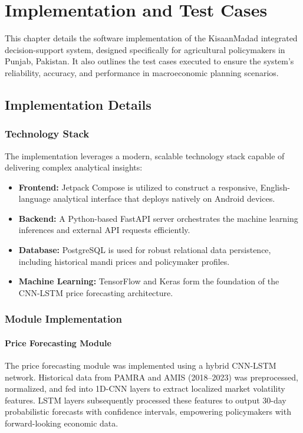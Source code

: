 \chapter{Implementation and Test Cases}

This chapter details the software implementation of the KisaanMadad integrated decision-support system, designed specifically for agricultural policymakers in Punjab, Pakistan. It also outlines the test cases executed to ensure the system's reliability, accuracy, and performance in macroeconomic planning scenarios.

\section{Implementation Details}

\subsection{Technology Stack}
The implementation leverages a modern, scalable technology stack capable of delivering complex analytical insights:
\begin{itemize}
    \item \textbf{Frontend:} Jetpack Compose is utilized to construct a responsive, English-language analytical interface that deploys natively on Android devices.
    \item \textbf{Backend:} A Python-based FastAPI server orchestrates the machine learning inferences and external API requests efficiently.
    \item \textbf{Database:} PostgreSQL is used for robust relational data persistence, including historical mandi prices and policymaker profiles.
    \item \textbf{Machine Learning:} TensorFlow and Keras form the foundation of the CNN-LSTM price forecasting architecture.
\end{itemize}

\subsection{Module Implementation}
\subsubsection{Price Forecasting Module}
The price forecasting module was implemented using a hybrid CNN-LSTM network. Historical data from PAMRA and AMIS (2018--2023) was preprocessed, normalized, and fed into 1D-CNN layers to extract localized market volatility features. LSTM layers subsequently processed these features to output 30-day probabilistic forecasts with confidence intervals, empowering policymakers with forward-looking economic data.

